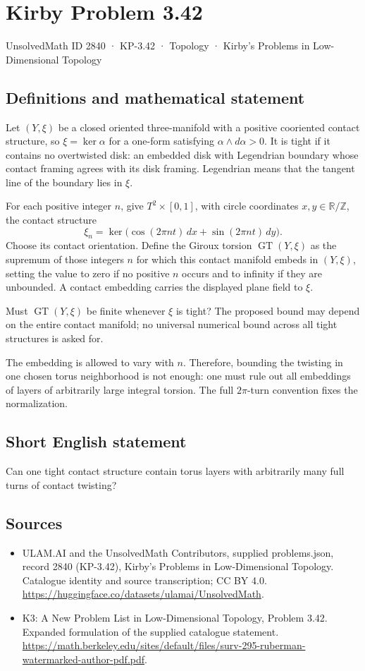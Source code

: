 \documentclass[11pt,a4paper]{article}
\begin{document}
\section*{Kirby Problem 3.42}\label{2840}
{\small UnsolvedMath ID 2840 · KP-3.42 · Topology · Kirby's Problems in Low-Dimensional Topology}
\subsection{Definitions and mathematical statement}
Let $(Y,\xi)$ be a closed oriented three-manifold with a positive cooriented contact structure, so $\xi=\ker\alpha$ for a one-form satisfying $\alpha\wedge d\alpha>0$. It is tight if it contains no overtwisted disk: an embedded disk with Legendrian boundary whose contact framing agrees with its disk framing. Legendrian means that the tangent line of the boundary lies in $\xi$.

For each positive integer $n$, give $T^2\times[0,1]$, with circle coordinates $x,y\in\mathbb R/\mathbb Z$, the contact structure
\[
\xi_n=\ker\bigl(\cos(2\pi nt)\,dx+\sin(2\pi nt)\,dy\bigr).
\]
Choose its contact orientation. Define the Giroux torsion $\operatorname{GT}(Y,\xi)$ as the supremum of those integers $n$ for which this contact manifold embeds in $(Y,\xi)$, setting the value to zero if no positive $n$ occurs and to infinity if they are unbounded. A contact embedding carries the displayed plane field to $\xi$.

Must $\operatorname{GT}(Y,\xi)$ be finite whenever $\xi$ is tight? The proposed bound may depend on the entire contact manifold; no universal numerical bound across all tight structures is asked for.

The embedding is allowed to vary with $n$. Therefore, bounding the twisting in one chosen torus neighborhood is not enough: one must rule out all embeddings of layers of arbitrarily large integral torsion. The full $2\pi$-turn convention fixes the normalization.
\subsection{Short English statement}
Can one tight contact structure contain torus layers with arbitrarily many full turns of contact twisting?
\subsection{Sources}
\begin{itemize}
\item[S1] ULAM.AI and the UnsolvedMath Contributors, supplied problems.json, record 2840 (KP-3.42), Kirby's Problems in Low-Dimensional Topology. Catalogue identity and source transcription; CC BY 4.0.
\url{https://huggingface.co/datasets/ulamai/UnsolvedMath}.
\item[S2] K3: A New Problem List in Low-Dimensional Topology, Problem 3.42. Expanded formulation of the supplied catalogue statement.
\url{https://math.berkeley.edu/sites/default/files/surv-295-ruberman-watermarked-author-pdf.pdf}.
\end{itemize}
\end{document}
